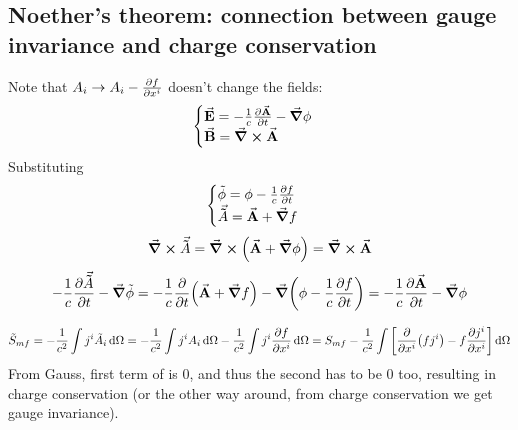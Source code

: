 \subsection{Noether's theorem: connection between gauge invariance and charge conservation}
Note that $A_i \to A_i - \pdv{f}{x^i}$ doesn't change the fields:
$$\begin{cases}
\va{E} = -\frac{1}{c} \pdv{\va{A}}{t} - \grad{\phi}\\
\va{B}= \curl{\va{A}}
\end{cases}$$
Substituting
$$\begin{cases}
\tilde{\phi} = \phi - \frac{1}{c}\pdv{f}{t}\\
\va{\tilde{A}} = \va{A} + \grad{f}
\end{cases}$$
$$\curl{\va{\tilde{A}}} =\curl(\va{A} + \grad{\phi}) = \curl{\va{A}}$$
$$-\frac{1}{c} \pdv{\va{\tilde{A}}}{t} - \grad{\tilde{\phi}} = -\frac{1}{c} \pdv{t} \qty(\va{A} + \grad{f}) - \grad(\phi - \frac{1}{c} \pdv{f}{t}) = -\frac{1}{c} \pdv{\va{A}}{t} - \grad{\phi}$$

$$\tilde{S}_{mf} = -\frac{1}{c^2} \int j^i \tilde{A}_i \dd{\Omega} = -\frac{1}{c^2}\int j^i A_i \dd{\Omega} - \frac{1}{c^2}\int j^i \pdv{f}{x^i} \dd{\Omega} = S_{mf} - \frac{1}{c^2} \int \qty[\pdv{x^i} (fj^i) - f\pdv{j^i}{x^i}] \dd{\Omega}$$
From Gauss, first term of is 0, and thus the second has to be 0 too, resulting in charge conservation (or the other way around, from charge conservation we get gauge invariance).
